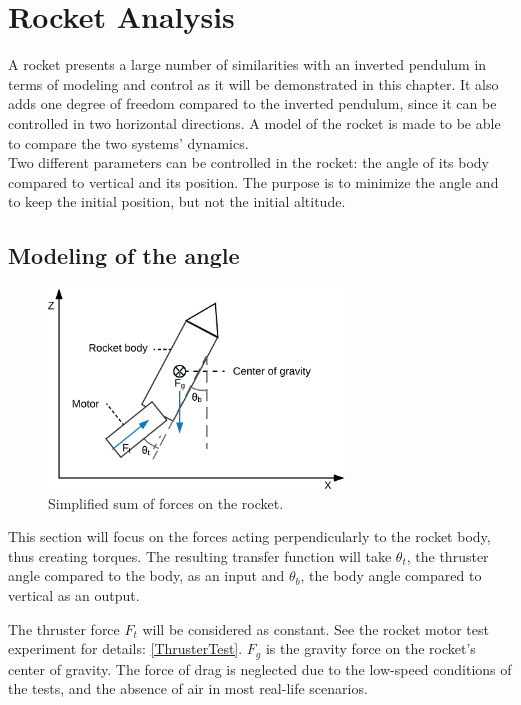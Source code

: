\chapter{Rocket Analysis}\label{chap:RockAnalyis}

		A rocket presents a large number of similarities with an inverted pendulum in terms of modeling and control as it will be demonstrated in this chapter. It also adds one degree of freedom compared to the inverted pendulum, since it can be controlled in two horizontal directions. A model of the rocket is made to be able to compare the two systems' dynamics.
		\\
		Two different parameters can be controlled in the rocket: the angle of its body compared to vertical and its position.
		The purpose is to minimize the angle and to keep the initial position, but not the initial altitude.
		
		
		\section{Modeling of the angle}
		\begin{figure}[htbp]
			\centering
			\includegraphics[width=0.7\textwidth]{figures/modeling/Rocket/rocket_angle_diagram.png}
			\caption{Simplified sum of forces on the rocket.}
			\label{fig:angle_diagram}
		\end{figure}
		
		This section will focus on the forces acting perpendicularly to the rocket body, thus creating torques.
		The resulting transfer function will take $\theta_t$, the thruster angle compared to the body, as an input and $\theta_b$, the body angle compared to vertical as an output.
		
		The thruster force $F_t$ will be considered as constant. See the rocket motor test experiment for details: \autoref{ThrusterTest}. $F_g$ is the gravity force on the rocket's center of gravity. The force of drag is neglected due to the low-speed conditions of the tests, and the absence of air in most real-life scenarios.


